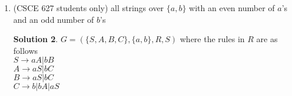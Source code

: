 \documentclass[12pt]{article}
\theoremstyle{definition}
\newtheorem*{solution}{Solution}
\begin{document}
\begin{enumerate}
\begin{enumerate}
\begin{solution}
	$G = (\{S,A,B\}, \{a,b\}, R, S)$ where the rules in $R$ are as follows\\ 
	$S \rightarrow aA | bB | a$ \\ 
	$A \rightarrow bA | b | bS $ \\
	$B \rightarrow bB | bS | a$
	\end{solution}
  \item (CSCE 627 students only) all strings over $\{a,b\}$ with an
        even number of $a$'s and an odd number of $b$'s
	\begin{solution}
	$G = (\{S,A,B,C\}, \{a,b\}, R, S)$ where the rules in $R$ are as follows\\ 
	$S \rightarrow aA | bB $ \\ 
	$A \rightarrow aS | bC$ \\
	$B \rightarrow aS | bC $ \\
	$C \rightarrow b | bA | aS$ \\
	\end{solution}
  \end{enumerate}


\end{enumerate}
\end{document}

